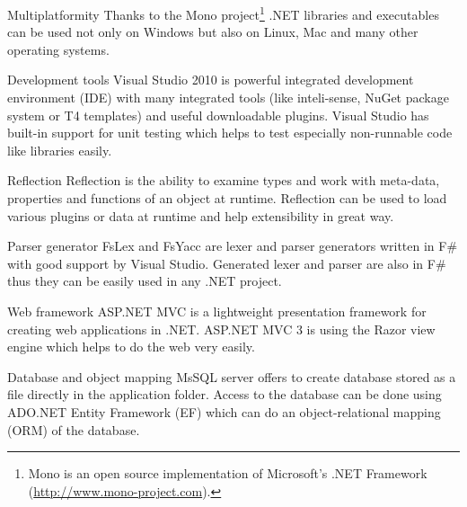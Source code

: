 \begin{description*}
	\item[Multiplatformity]
		Thanks to the Mono project\footnote{Mono is an open source implementation of Microsoft's .NET Framework (\url{http://www.mono-project.com}).}
			.NET libraries and executables can be used not only on Windows but also on Linux, Mac and many other operating systems.
	\item[Development tools]
		Visual Studio 2010 is powerful integrated development environment (IDE) with many integrated tools (like inteli-sense, NuGet package system or T4 templates) and useful downloadable plugins.
		Visual Studio has built-in support for unit testing which helps to test especially non-runnable code like libraries easily.
	\item[Reflection]
		Reflection is the ability to examine types and work with meta-data, properties and functions of an object at runtime.
		Reflection can be used to load various plugins or data at runtime and help extensibility in great way.
	\item[Parser generator]
		FsLex and FsYacc are lexer and parser generators written in F\# with good support by Visual Studio.
		Generated lexer and parser are also in F\# thus they can be easily used in any .NET project.
	\item[Web framework]
		ASP.NET MVC is a lightweight presentation framework for creating web applications in .NET.
		ASP.NET MVC 3 is using the Razor view engine which helps to do the web very easily.
	\item[Database and object mapping]
		MsSQL server offers to create database stored as a file directly in the application folder.
		Access to the database can be done using ADO.NET Entity Framework (EF) which can do an object-relational mapping (ORM) of the database.
\end{description*}






\clearpage



















